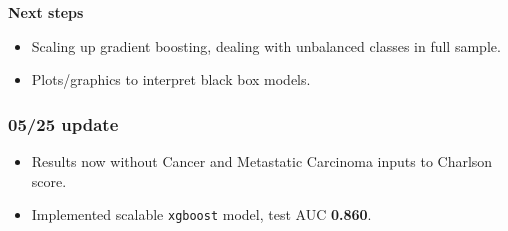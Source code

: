 \documentclass[12pt]{article}
\begin{document}
{\bf Next steps}
\begin{itemize}
  \item Scaling up gradient boosting, dealing with unbalanced classes in full sample.
  \item Plots/graphics to interpret black box models.
\end{itemize}

\pagebreak

\subsubsection*{05/25 update}

\begin{itemize}
  \item Results now without Cancer and Metastatic Carcinoma inputs to Charlson score.
  \item Implemented scalable \texttt{xgboost} model, test AUC \textbf{0.860}.
\end{itemize}
\end{document}
